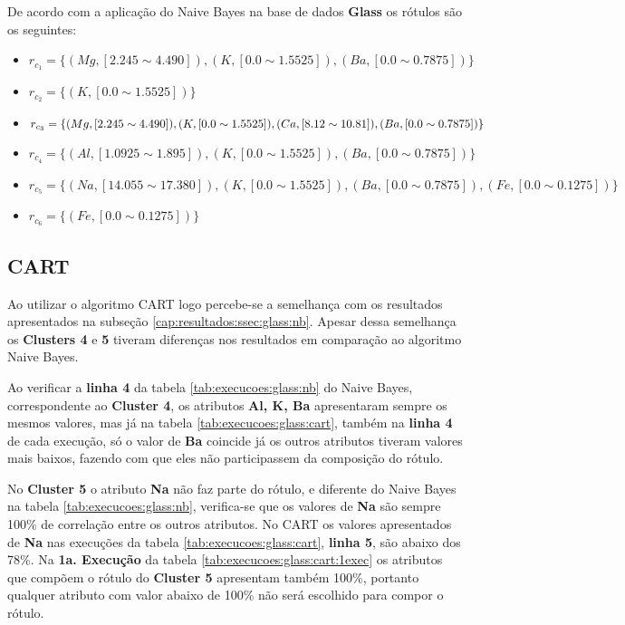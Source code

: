 De acordo com a aplicação do Naive Bayes na base de dados \textbf{Glass} os rótulos são os seguintes:
\begin{itemize}[noitemsep]
 \item ${r_{c_1}=\{ (Mg, [ 2.245 \sim 4.490 ]), (K,[ 0.0 \sim 1.5525 ] ), (Ba,[ 0.0 \sim 0.7875 ] ) \} }$  
 \item ${r_{c_2}=\{ (K,[ 0.0 \sim 1.5525 ] ) \} }$
 \item ${r_{c_3}=\{ (Mg, [ 2.245 \sim 4.490 ]), (K,[ 0.0 \sim 1.5525 ] ), (Ca,[ 8.12 \sim 10.81 ] ), \nonumber \\
 \\ (Ba,[ 0.0 \sim 0.7875 ] ) \} }$  
 \item ${r_{c_4}=\{(Al,[ 1.0925 \sim 1.895 ] ), (K,[ 0.0 \sim 1.5525 ] ), (Ba,[ 0.0 \sim 0.7875 ] ) \} }$
 \item ${r_{c_5}=\{ (Na,[ 14.055 \sim 17.380 ] ), (K,[ 0.0 \sim 1.5525 ] ), (Ba,[ 0.0 \sim 0.7875 ] ), (Fe,[ 0.0 \sim 0.1275 ] ) \} }$
 \item ${r_{c_6}=\{ (Fe,[ 0.0 \sim 0.1275 ] ) \} }$
\end{itemize}


\subsection{CART} \label{cap:resultados:ssec:glass:cart}

Ao utilizar o algoritmo CART logo percebe-se a semelhança com os resultados apresentados na subseção \ref{cap:resultados:ssec:glass:nb}. Apesar dessa semelhança os \textbf{Clusters 4} e \textbf{5} tiveram diferenças nos resultados em comparação ao algoritmo Naive Bayes. 

Ao verificar a \textbf{linha 4} da tabela \ref{tab:execucoes:glass:nb} do Naive Bayes, correspondente ao \textbf{Cluster 4}, os atributos \textbf{Al, K, Ba} apresentaram sempre os mesmos valores, mas já na tabela \ref{tab:execucoes:glass:cart}, também na \textbf{linha 4} de cada execução, só o valor de \textbf{Ba} coincide já os outros atributos tiveram valores mais baixos, fazendo com que eles não participassem da composição do rótulo.

No \textbf{Cluster 5} o atributo \textbf{Na} não faz parte do rótulo, e diferente do Naive Bayes  na tabela \ref{tab:execucoes:glass:nb}, verifica-se que os valores de \textbf{Na} são sempre 100\% de correlação entre os outros atributos. No CART os valores apresentados de \textbf{Na}  nas execuções da tabela \ref{tab:execucoes:glass:cart}, \textbf{linha 5}, são abaixo dos 78\%. Na \textbf{1a. Execução} da tabela \ref{tab:execucoes:glass:cart:1exec} os atributos que compõem o rótulo do \textbf{Cluster 5} apresentam também 100\%, portanto qualquer atributo com valor abaixo de 100\%  não será escolhido para compor o rótulo.

